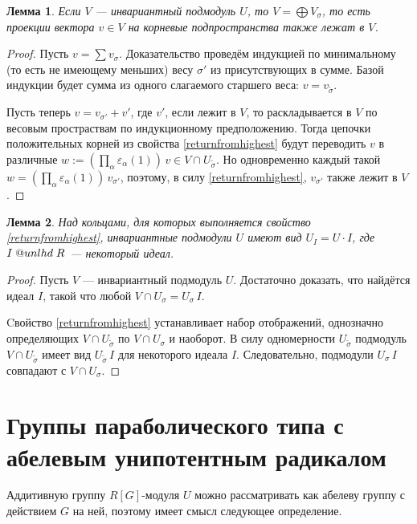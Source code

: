 \documentclass[12pt]{matmex-diploma}
\makeatletter
\newcommand{\slunlhd}{%
  \mathrel{\mathpalette\sl@unlhd\relax}%
}
\newcommand{\sl@unlhd}[2]{%
  \sbox\z@{$#1\lhd$}%
  \sbox\tw@{$#1\leqslant$}%
  \dimen@=\ht\tw@
  \advance\dimen@-\ht\z@
  \ifx#1\displaystyle
    \advance\dimen@ .2pt
  \else
    \ifx#1\textstyle
      \advance\dimen@ .2pt
    \fi
  \fi
  \ooalign{\raisebox{\dimen@}{$\m@th#1\lhd$}\cr$\m@th#1\leqslant$\cr}%
}
\theoremstyle{mystyleni}
\theoremstyle{mystyle}
\newtheorem{lm}{Лемма}
\newcommand\refb[1]{\ref{#1}}
\renewcommand{\trianglelefteq}{\slunlhd}
\makeatother
\begin{document}
\begin{lm}\label{weightprojections}
Если $V$ --- инвариантный подмодуль $U$, то $V = \bigoplus V_\sigma$, то есть проекции вектора $v \in V$ на корневые подпространства также лежат в $V$.
\end{lm}
\begin{proof}
Пусть $v = \sum v_\sigma$. Доказательство проведём индукцией по минимальному (то есть не имеющему меньших) весу $\sigma'$ из присутствующих в сумме. Базой индукции будет сумма из одного слагаемого старшего веса: $v = v_{\widetilde\sigma}$.

Пусть теперь $v = v_{\sigma'} + v'$, где $v'$, если лежит в $V$, то раскладывается в $V$ по весовым простраствам по индукционному предположению. Тогда цепочки положительных корней из свойства \refb{returnfromhighest} будут переводить $v$ в различные $w := \left(\prod_{\alpha}\varepsilon_\alpha(1)\right) \, v \in V \cap U_{\widetilde\sigma}$. Но одновременно каждый такой $w = \left(\prod_{\alpha}\varepsilon_\alpha(1)\right) \, v_{\sigma'}$, поэтому, в силу \refb{returnfromhighest}, $v_{\sigma'}$ также лежит в $V$.
\end{proof}

\begin{lm}\label{unipotentsubgroups}
Над кольцами, для которых выполняется свойство \refb{returnfromhighest}, инвариантные подмодули $U$ имеют вид $U_I = U \cdot I$, где $I \trianglelefteq R$ --- некоторый идеал.
\end{lm}
\begin{proof}
Пусть $V$ --- инвариантный подмодуль $U$. Достаточно доказать, что найдётся идеал $I$, такой что любой $V \cap U_\sigma = U_\sigma \, I$.

Cвойство \refb{returnfromhighest} устанавливает набор отображений, однозначно определяющих $V \cap U_{\widetilde\sigma}$ по $V \cap U_\sigma$ и наоборот. В силу одномерности $U_{\widetilde\sigma}$ подмодуль $V \cap U_{\widetilde\sigma}$ имеет вид $U_{\widetilde\sigma} \, I$ для некоторого идеала $I$. Следовательно, подмодули $U_{\sigma} \, I$ совпадают с $V \cap U_\sigma$.
\end{proof}

\section{Группы параболического типа с абелевым унипотентным радикалом}

Аддитивную группу $R[G]$-модуля $U$ можно рассматривать как абелеву группу с действием $G$ на ней, поэтому
имеет смысл следующее определение.
\end{document}

